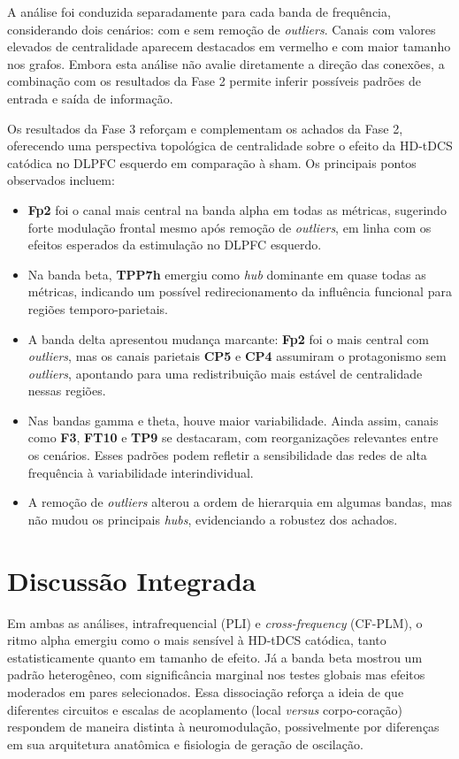 A análise foi conduzida separadamente para cada banda de frequência, considerando dois cenários: com e sem remoção de \textit{outliers}. Canais com valores elevados de centralidade aparecem destacados em vermelho e com maior tamanho nos grafos. Embora esta análise não avalie diretamente a direção das conexões, a combinação com os resultados da Fase 2 permite inferir possíveis padrões de entrada e saída de informação.

Os resultados da Fase 3 reforçam e complementam os achados da Fase 2, oferecendo uma perspectiva topológica de centralidade sobre o efeito da HD-tDCS catódica no DLPFC esquerdo em comparação à sham. Os principais pontos observados incluem:

\begin{itemize}
    \item \textbf{Fp2} foi o canal mais central na banda alpha em todas as métricas, sugerindo forte modulação frontal mesmo após remoção de \textit{outliers}, em linha com os efeitos esperados da estimulação no DLPFC esquerdo.
    \item Na banda beta, \textbf{TPP7h} emergiu como \textit{hub} dominante em quase todas as métricas, indicando um possível redirecionamento da influência funcional para regiões temporo-parietais.
    \item A banda delta apresentou mudança marcante: \textbf{Fp2} foi o mais central com \textit{outliers}, mas os canais parietais \textbf{CP5} e \textbf{CP4} assumiram o protagonismo sem \textit{outliers}, apontando para uma redistribuição mais estável de centralidade nessas regiões.
    \item Nas bandas gamma e theta, houve maior variabilidade. Ainda assim, canais como \textbf{F3}, \textbf{FT10} e \textbf{TP9} se destacaram, com reorganizações relevantes entre os cenários. Esses padrões podem refletir a sensibilidade das redes de alta frequência à variabilidade interindividual.
    \item A remoção de \textit{outliers} alterou a ordem de hierarquia em algumas bandas, mas não mudou os principais \textit{hubs}, evidenciando a robustez dos achados.
\end{itemize}

\section{Discussão Integrada}
Em ambas as análises, intrafrequencial (PLI) e \textit{cross-frequency} (CF-PLM), o ritmo alpha emergiu como o mais sensível à HD-tDCS catódica, tanto estatisticamente quanto em tamanho de efeito. Já a banda beta mostrou um padrão heterogêneo, com significância marginal nos testes globais mas efeitos moderados em pares selecionados. Essa dissociação reforça a ideia de que diferentes circuitos e escalas de acoplamento (local \textit{versus} corpo-coração) respondem de maneira distinta à neuromodulação, possivelmente por diferenças em sua arquitetura anatômica e fisiologia de geração de oscilação.

